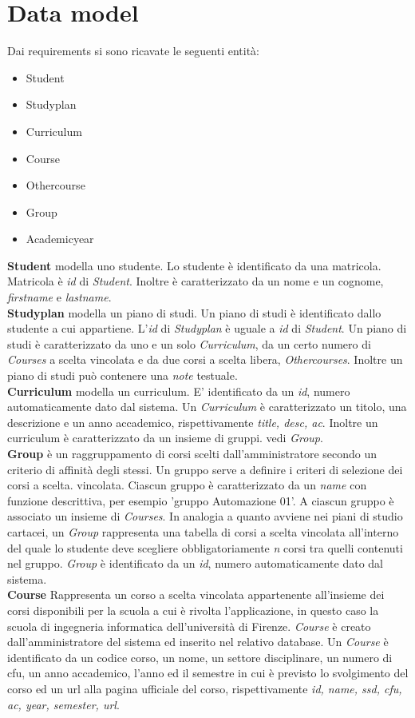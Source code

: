 \documentclass{article}
\begin{document}
\section{Data model}
Dai requirements si sono  ricavate le seguenti entità:
\begin{itemize}
\item Student
\item Studyplan
\item Curriculum
\item Course
\item Othercourse
\item Group
\item Academicyear
\end{itemize}
\textbf{Student} modella uno studente. Lo studente è identificato da una matricola. Matricola è \emph{id} di \emph{Student}. Inoltre è caratterizzato da un nome e un cognome, \emph{firstname} e \emph{lastname}.
\\
\textbf{Studyplan} modella un piano di studi. Un piano di studi è identificato dallo studente a cui appartiene. L'\emph{id}  di \emph{Studyplan} è uguale a \emph{id} di \emph{Student}. Un piano di studi è caratterizzato da uno e un solo \emph{Curriculum}, da un certo numero di \emph{Courses} a scelta vincolata e da due corsi a scelta libera, \emph{Othercourses}. Inoltre un piano di studi può contenere una \emph{note} testuale. 
\\
\textbf{Curriculum} modella un curriculum. E' identificato da un \emph{id}, numero automaticamente dato dal sistema. Un \emph{Curriculum} è caratterizzato un titolo, una descrizione e un anno accademico, rispettivamente \emph{title, desc, ac}. Inoltre un curriculum è caratterizzato da un insieme di gruppi. vedi \emph{Group}. 
\\
\textbf{Group} è un raggruppamento di corsi scelti dall'amministratore secondo un criterio di affinità degli stessi. Un gruppo serve a definire i criteri di selezione dei corsi a scelta. vincolata. Ciascun gruppo è caratterizzato da un \emph{name} con funzione descrittiva, per esempio 'gruppo Automazione 01'.  A ciascun gruppo è associato un insieme di \emph{Courses}. In analogia a quanto avviene nei piani di studio cartacei, un \emph{Group} rappresenta una tabella di corsi a scelta vincolata all'interno del quale lo studente deve scegliere obbligatoriamente  \emph{n}  corsi tra quelli contenuti nel gruppo. \emph{Group} è identificato da un \emph{id}, numero automaticamente dato dal sistema.  
\\
\textbf{Course} Rappresenta un corso a scelta vincolata appartenente all'insieme dei corsi disponibili per la scuola a cui è rivolta l'applicazione, in questo caso la scuola di ingegneria informatica dell'università di Firenze. \emph{Course} è creato dall'amministratore del sistema ed inserito nel relativo database. Un \emph{Course} è identificato da un codice corso, un nome, un settore disciplinare, un numero di cfu, un anno accademico,  l'anno ed il semestre in cui è previsto lo svolgimento del corso ed un url alla pagina ufficiale del corso, rispettivamente \emph{id, name, ssd, cfu, ac, year, semester, url}.
\end{document}
